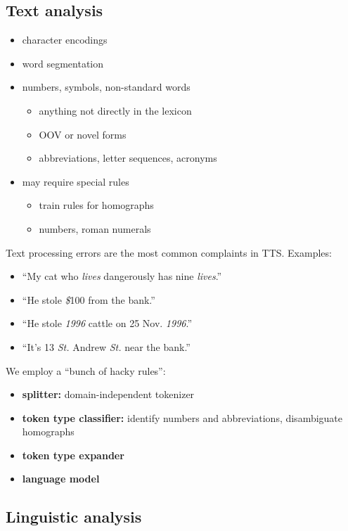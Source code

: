 \subsection{Text analysis}
\begin{itemize}
    \item character encodings
    \item word segmentation
    \item numbers, symbols, non-standard words
        \begin{itemize}
            \item anything not directly in the lexicon
            \item OOV or novel forms
            \item abbreviations, letter sequences, acronyms
        \end{itemize}
    \item may require special rules
        \begin{itemize}
            \item train rules for homographs
            \item numbers, roman numerals
        \end{itemize}
\end{itemize}
Text processing errors are the most common complaints in TTS. Examples:
\begin{itemize}
    \item ``My cat who \textit{lives} dangerously has nine \textit{lives}.''
    \item ``He stole \textit{\$}100 from the bank.''
    \item ``He stole \textit{1996} cattle on 25 Nov. \textit{1996}.''
    \item ``It's 13 \textit{St.} Andrew \textit{St.} near the bank.''
\end{itemize}
We employ a ``bunch of hacky rules'':
\begin{itemize}
    \item \textbf{splitter:} domain-independent tokenizer
    \item \textbf{token type classifier:} identify numbers and abbreviations, disambiguate homographs
    \item \textbf{token type expander}
    \item \textbf{language model}
\end{itemize}

\subsection{Linguistic analysis}

